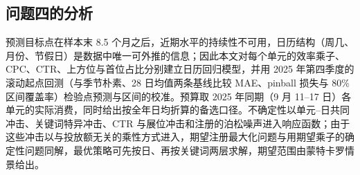 \subsection{问题四的分析}
预测目标点在样本末 8.5 个月之后，近期水平的持续性不可用，日历结构（周几、月份、节假日）是数据中唯一可外推的信息；因此本文对每个单元的效率乘子、CPC、CTR、上方位与首位占比分别建立日历回归模型，并用 2025 年第四季度的滚动起点回测（与季节朴素、28 日均值两条基线比较 MAE、pinball 损失与 80\% 区间覆盖率）检验点预测与区间的校准。预算取 2025 年同期（9 月 11--17 日）各单元的实际消费，同时给出按全年日均折算的备选口径。不确定性以单元--日共同冲击、关键词特异冲击、CTR 与展位冲击和注册的泊松噪声进入响应函数；由于这些冲击以与投放额无关的乘性方式进入，期望注册最大化问题与用期望乘子的确定性问题同解，最优策略可先按日、再按关键词两层求解，期望范围由蒙特卡罗情景给出。

